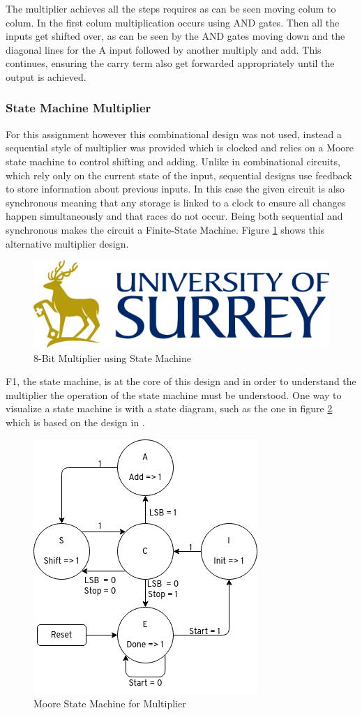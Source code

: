 \documentclass[11pt]{article}
\begin{document}
The multiplier achieves all the steps requires as can be seen moving colum to colum. 
In the first colum multiplication occurs using AND gates.
Then all the inputs get shifted over, as can be seen by the AND gates moving down and the diagonal lines for the A input followed by another multiply and add.
This continues, ensuring the carry term also get forwarded appropriately until the output is achieved.

\subsubsection{State Machine Multiplier}

For this assignment however this combinational design was not used, 
instead a sequential style of multiplier was provided which is clocked and relies on a Moore state machine to control shifting and adding.
Unlike in combinational circuits, which rely only on the current state of the input, sequential designs use feedback to store information about previous inputs\cite{dally}.
In this case the given circuit is also synchronous meaning that any storage is linked to a clock to ensure all changes happen simultaneously and that races do not occur.
Being both sequential and synchronous makes the circuit a Finite-State Machine\cite{dally}.
Figure \ref{fig:4bit_mult} shows this alternative multiplier design. 

\begin{figure}[H]        
    \centering
    \includegraphics[width=.5\textwidth]{Logo.png}
    \caption{8-Bit Multiplier using State Machine}
    \label{fig:4bit_mult}
\end{figure} 

F1, the state machine, is at the core of this design and in order to understand the multiplier the operation of the state machine must be understood.
One way to visualize a state machine is with a state diagram, such as the one in figure \ref{fig:msm} which is based on the design in \cite{smith1997application}.

\begin{figure}[H]        
    \centering
    \includegraphics[width=.5\textwidth]{StateMachine.png}
    \caption{Moore State Machine for Multiplier}
    \label{fig:msm}
\end{figure} 
\end{document}
